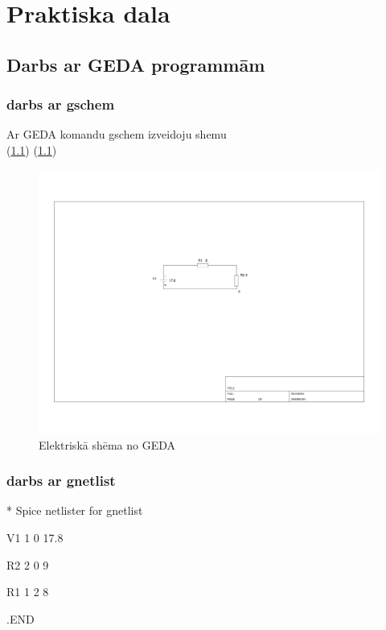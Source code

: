 \documentclass{report}
\begin{document}
\chapter{Praktiska dala}
\section{Darbs ar GEDA programmām}
\subsection{darbs ar gschem}
Ar GEDA komandu gschem izveidoju shemu\\(\ref{GEDA Shema})
(\ref{GEDA Shema})
\begin{figure}[!tb]
\includegraphics[width=\textwidth,height=\textheight,keepaspectratio]{IMAGES/01.png}
\caption{Elektriskā shēma no GEDA}
\label{GEDA Shema}
\end{figure}
\subsection{darbs ar gnetlist}
\begin{flushleft}
* Spice netlister for gnetlist

V1  1   0   17.8

R2  2   0   9

R1  1   2   8

.END
\end{flushleft}
\end{document}
